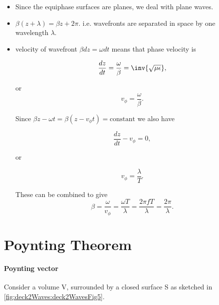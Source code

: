 \begin{itemize}
\item Since the equiphase surfaces are planes, we deal with plane waves.
\item \( \beta( z + \lambda ) = \beta z + 2 \pi \).  i.e. wavefronts are separated in space by one wavelength \( \lambda \).
\item velocity of wavefront \( \beta dz = \omega dt \) means that phase velocity is

\begin{equation}\label{eqn:uwavesLecture2:1100}
\frac{dz}{dt} = \frac{\omega}{\beta} = \inv{\sqrt{\mu \epsilon} },
\end{equation}

or
\begin{dmath}\label{eqn:uwavesDeck2WaveEquationCore:1500}
v_\phi = \frac{\omega}{\beta}.
\end{dmath}

Since \( \beta z - \omega t = \beta ( z - v_\phi t ) = \textrm{constant} \) we also have

\begin{dmath}\label{eqn:uwavesDeck2WaveEquationCore:1520}
\frac{dz}{dt} - v_\phi = 0,
\end{dmath}

or

\begin{dmath}\label{eqn:uwavesDeck2WaveEquationCore:1540}
v_\phi = \frac{\lambda}{T}.
\end{dmath}

These can be combined to give
\begin{dmath}\label{eqn:uwavesDeck2WaveEquationCore:1560}
\beta
= \frac{\omega}{v_\phi}
= \frac{\omega T}{\lambda}
= \frac{2 \pi f T}{\lambda}
= \frac{2 \pi}{\lambda}.
\end{dmath}

\end{itemize}

\section{Poynting Theorem}

\paragraph{Poynting vector}

Consider a volume V, surrounded by a closed surface S as sketched in \cref{fig:deck2Waves:deck2WavesFig5}.

